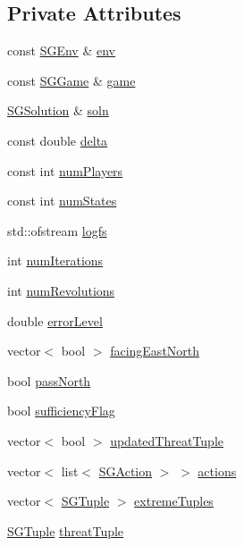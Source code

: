 \subsection*{Private Attributes}
\begin{DoxyCompactItemize}
\item 
const \hyperlink{classSGEnv}{S\+G\+Env} \& \hyperlink{classSGApprox_a6597417918c1e6c764f4f943c72af781}{env}
\item 
const \hyperlink{classSGGame}{S\+G\+Game} \& \hyperlink{classSGApprox_a0774e3ed0ff009809606a42c9e7ef727}{game}
\item 
\hyperlink{classSGSolution}{S\+G\+Solution} \& \hyperlink{classSGApprox_aaed7d16ba723bbdfbec94b21e0edff8e}{soln}
\item 
const double \hyperlink{classSGApprox_ad105b178e4e85845ce5a85e26d7d038b}{delta}
\item 
const int \hyperlink{classSGApprox_a6f512c1cb974247ecb24c2201f045905}{num\+Players}
\item 
const int \hyperlink{classSGApprox_a676bda37d610e501eac72037d22b5293}{num\+States}
\item 
std\+::ofstream \hyperlink{classSGApprox_aa95ff6bda46617fbaa7cf1c8d6708748}{logfs}
\item 
int \hyperlink{classSGApprox_a7ab53424f5933726a15001ff2885a4a9}{num\+Iterations}
\item 
int \hyperlink{classSGApprox_a2bd0cab80a3f8d799fdc2841b65dd2c2}{num\+Revolutions}
\item 
double \hyperlink{classSGApprox_aee816ed49535cfc211aa34d0e6064e01}{error\+Level}
\item 
vector$<$ bool $>$ \hyperlink{classSGApprox_a44ce2e0eba77e1c7c155f38662cba9d0}{facing\+East\+North}
\item 
bool \hyperlink{classSGApprox_aec0377b26f0efaea314f72554a8862b9}{pass\+North}
\item 
bool \hyperlink{classSGApprox_ac683c5ef90b22b635d4c70861ca08887}{sufficiency\+Flag}
\item 
vector$<$ bool $>$ \hyperlink{classSGApprox_ae680fd19d6a65aecee81dffeba8e8595}{updated\+Threat\+Tuple}
\item 
vector$<$ list$<$ \hyperlink{classSGAction}{S\+G\+Action} $>$ $>$ \hyperlink{classSGApprox_a0fccecf0f5dbe7e9288e47182f180879}{actions}
\item 
vector$<$ \hyperlink{classSGTuple}{S\+G\+Tuple} $>$ \hyperlink{classSGApprox_ab0e2c4678401f806922ac64667ad5ff6}{extreme\+Tuples}
\item 
\hyperlink{classSGTuple}{S\+G\+Tuple} \hyperlink{classSGApprox_a69815072fd57ec5b6b137dc839371ec7}{threat\+Tuple}

\end{DoxyCompactItemize}
